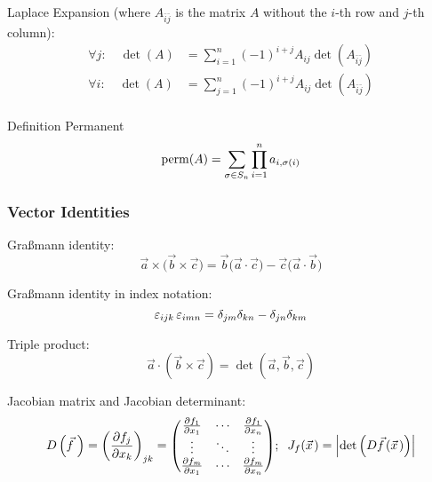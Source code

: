			\noindent
			Laplace Expansion (where $A_{\bar{i}\bar{j}}$ is the matrix $A$ without the $i$-th row and $j$-th column):
			\begin{equation}
				\begin{aligned}
					\forall j: \quad \det(A) &= \sum_{i=1}^n (-1)^{i+j}A_{ij} \det(A_{\bar{i}\bar{j}}) \\ 
					\forall i: \quad \det(A) &= \sum_{j=1}^n (-1)^{i+j}A_{ij} \det(A_{\bar{i}\bar{j}}) \\
				\end{aligned}
			\end{equation}

			\noindent
			Definition Permanent
			\begin{equation}
				\mathrm{perm}(A) = \sum_{\sigma\in S_n} \prod_{i=1}^n a_{i,\sigma(i)}
			\end{equation}

		\subsubsection{Vector Identities}
			\noindent
			Graßmann identity:
			\begin{equation}
				\vec{a}\times\big(\vec{b}\times\vec{c}\big) = \vec{b}\big(\vec{a}\cdot\vec{c}\big) - \vec{c}\big(\vec{a}\cdot\vec{b}\big)
			\end{equation}

			\noindent
			Graßmann identity in index notation:
			\begin{equation}
				\varepsilon_{ijk}\,\varepsilon_{imn}=\delta_{jm}\delta_{kn}-\delta_{jn}\delta_{km}
			\end{equation}

			\noindent
			Triple product:
			\begin{equation}
				\vec{a}\cdot\left(\vec{b}\times\vec{c}\right) = \det\left(\vec{a},\vec{b},\vec{c}\right)
			\end{equation}

			\noindent
			Jacobian matrix and Jacobian determinant:
			\begin{equation}
				D\left(\vec{f}\,\right) = \left(\frac{\partial f_j}{\partial x_k}\right)_{jk}
				= \mqty(
				\frac{\partial f_1}{\partial x_1} & \dotsb & \frac{\partial f_1}{\partial x_n} \\
				\vdots & \ddots & \vdots \\
				\frac{\partial f_m}{\partial x_1} & \dotsb & \frac{\partial f_m}{\partial x_n} \\
				);\;\;J_f(\vec{x})=\abs{\det\left(D\vec{f}(\vec{x})\right)}
			\end{equation}


